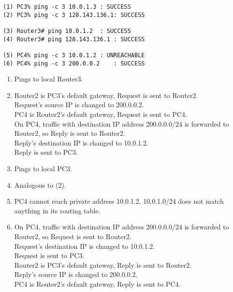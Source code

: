 \begin{lstlisting}
(1) PC3% ping -c 3 10.0.1.3	: SUCCESS
(2) PC3% ping -c 3 128.143.136.1: SUCCESS

(3) Router3# ping 10.0.1.2	: SUCCESS
(4) Router3# ping 128.143.136.1	: SUCCESS

(5) PC4% ping -c 3 10.0.1.2	: UNREACHABLE
(6) PC4% ping -c 3 200.0.0.2	: SUCCESS
\end{lstlisting}

\begin{enumerate}
\item Pings to local Router3.
\item Router2 is PC3's default gateway, Request is sent to Router2. \\
      Request's source IP is changed to 200.0.0.2. \\ 
      PC4 is Router2's default gateway, Request is sent to PC4. \\
      On PC4, traffic with destination IP address 200.0.0.0/24 is forwarded to Router2, so Reply is sent to Router2. \\
      Reply's destination IP is changed to 10.0.1.2. \\
      Reply is sent to PC3.
\item Pings to local PC3.
\item Analogous to (2).
\item PC4 cannot reach private address 10.0.1.2. 10.0.1.0/24 does not match anything in its routing table.
\item On PC4, traffic with destination IP address 200.0.0.0/24 is forwarded to Router2, so Request is sent to Router2. \\
      Request's destination IP is changed to 10.0.1.2. \\
      Request is sent to PC3. \\
      Router2 is PC3's default gateway, Reply is sent to Router2. \\
      Reply's source IP is changed to 200.0.0.2. \\ 
      PC4 is Router2's default gateway, Reply is sent to PC4. \\
\end{enumerate}

